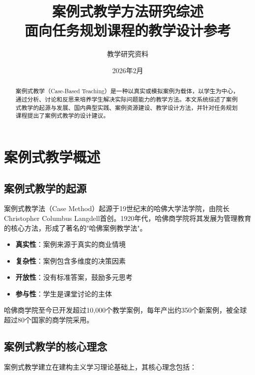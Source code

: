 \documentclass[12pt,a4paper]{ctexart}
\title{\textbf{案例式教学方法研究综述}\\[0.5em]
\large 面向任务规划课程的教学设计参考}
\author{教学研究资料}
\date{2026年2月}
\begin{document}
\maketitle

\begin{abstract}
案例式教学（Case-Based Teaching）是一种以真实或模拟案例为载体，以学生为中心，通过分析、讨论和反思来培养学生解决实际问题能力的教学方法。本文系统综述了案例式教学的起源与发展、国内典型实践、案例资源建设、教学设计方法，并针对任务规划课程提出了案例式教学的设计建议。
\end{abstract}

\tableofcontents
\newpage

\section{案例式教学概述}

\subsection{案例式教学的起源}

案例式教学法（Case Method）起源于19世纪末的哈佛大学法学院，由院长Christopher Columbus Langdell首创。1920年代，哈佛商学院将其发展为管理教育的核心方法，形成了著名的"哈佛案例教学法"。

\begin{keypoint}[哈佛案例教学法的核心特征]
\begin{itemize}[leftmargin=2em]
    \item \textbf{真实性}：案例来源于真实的商业情境
    \item \textbf{复杂性}：案例包含多维度的决策因素
    \item \textbf{开放性}：没有标准答案，鼓励多元思考
    \item \textbf{参与性}：学生是课堂讨论的主体
\end{itemize}
\end{keypoint}

哈佛商学院至今已开发超过10,000个教学案例，每年产出约350个新案例，被全球超过80个国家的商学院采用。

\subsection{案例式教学的核心理念}

案例式教学建立在建构主义学习理论基础上，其核心理念包括：
\end{document}
